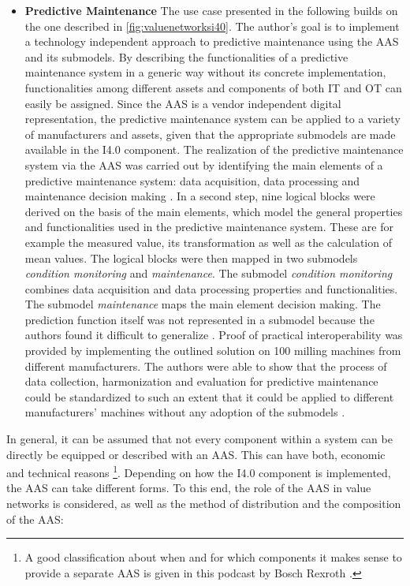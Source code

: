 \begin{itemize}
    \item [] \textbf{Predictive Maintenance} The use case presented in the following builds on the one described in \ref{fig:valuenetworksi40}. The author's goal is to implement a technology independent approach to predictive maintenance using the \ac{AAS} and its submodels. By describing the functionalities of a predictive maintenance system in a generic way without its concrete implementation, functionalities among different assets and components of both IT and OT can easily be assigned. Since the  \ac{AAS} is a vendor independent digital representation, the predictive maintenance system can be applied to a variety of manufacturers and assets, given that the appropriate submodels are made available in the \ac{I4.0} component. The realization of the predictive maintenance system via the \ac{AAS} was carried out by identifying the main elements of a predictive maintenance system: data acquisition, data processing and maintenance decision making \cite[p. 4]{Cavalieri2020AShell}. In a second step, nine logical blocks were derived on the basis of the main elements, which model the general properties and functionalities used in the  predictive maintenance system. These are for example the measured value, its transformation as well as the calculation of mean values. The logical blocks were then mapped in two submodels \textit{condition monitoring} and \textit{maintenance}. The submodel \textit{condition monitoring} combines data acquisition and data processing properties and functionalities. The submodel \textit{maintenance} maps the main element decision making. The prediction function itself was not represented in a submodel because the authors found it  difficult to generalize \cite[p. 10]{Cavalieri2020AShell}. Proof of practical interoperability was provided by implementing the outlined solution on 100 milling machines from different manufacturers. The authors were able to show that the process of data collection, harmonization and evaluation for predictive maintenance could be standardized to such an extent that it could be applied to different manufacturers' machines without any adoption of the submodels  \cite[p. 17]{Cavalieri2020AShell}.  
\end{itemize}

In general, it can be assumed that not every component within a system can be directly be equipped or described with an \ac{AAS}. This can have both, economic and technical reasons \footnote{A good classification about when and for which components it makes sense to provide a separate \ac{AAS} is given in this podcast by Bosch Rexroth \cite{Noll2021WasRexroth}.}. Depending on how the \ac{I4.0} component is implemented, the \ac{AAS} can take different forms. To this end, the role of the \ac{AAS} in value networks is considered, as well as the method of distribution and the composition of the \ac{AAS}:

